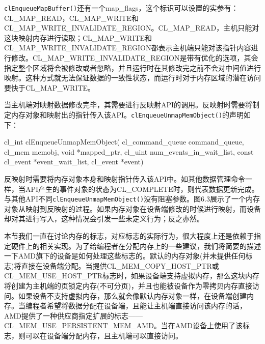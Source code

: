 \texttt{clEnqueueMapBuffer()}还有一个map\_\allowbreak{}flags，这个标识可以设置的实参有：CL\_\allowbreak{}MAP\_\allowbreak{}READ，CL\_\allowbreak{}MAP\_\allowbreak{}WRITE和CL\_\allowbreak{}MAP\_\allowbreak{}WRITE\_\allowbreak{}INVALIDATE\_\allowbreak{}REGION。CL\_\allowbreak{}MAP\_\allowbreak{}READ，主机只能对这块映射内存进行读取；CL\_\allowbreak{}MAP\_\allowbreak{}WRITE和CL\_\allowbreak{}MAP\_\allowbreak{}WRITE\_\allowbreak{}INVALIDATE\_\allowbreak{}REGION都表示主机端只能对该指针内容进行修改。CL\_\allowbreak{}MAP\_\allowbreak{}WRITE\_\allowbreak{}INVALIDATE\_\allowbreak{}REGION是带有优化的选项，其会指定整个区域将会被修改或者忽略，并且运行时在其修改完之前不会对中间值进行映射。这种方式就无法保证数据的一致性状态，而运行时对于内存区域的潜在访问要快于CL\_\allowbreak{}MAP\_\allowbreak{}WRITE。

当主机端对映射数据修改完毕，其需要进行反映射API的调用。反映射时需要将制定内存对象和映射出的指针传入该API。\texttt{clEnqueueUnmapMemObject()}的声明如下：

\begin{codebox}[cpp]
cl_int
clEnqueueUnmapMemObject(
  cl_command_queue command_queue,
  cl_mem memobj,
  void *mapped_ptr,
  cl_uint num_events_in_wait_list,
  const cl_event *event_wait_list,
  cl_event *event)
\end{codebox}

反映射时需要将内存对象本身和映射指针传入该API中。如其他数据管理命令一样，当API产生的事件对象的状态为CL\_\allowbreak{}COMPLETE时，则代表数据更新完成。与其他API不同\texttt{clEnqueueUnmapMemObject()}没有阻塞参数。图6.3展示了一个内存对象从映射到反映射的过程。如果内存对象在设备端修改的时候进行映射，而设备却对其进行写入，这种情况会引发一些未定义行为；反之亦然。


本节我们一直在讨论内存的标志，对应标志的实际行为，很大程度上还是依赖于指定硬件上的相关实现。为了给编程者在分配内存上的一些建议，我们将简要的描述一下AMD旗下的设备是如何处理这些标志的。默认的内存对象(并未提供任何标志)将直接在设备端分配。当提供CL\_\allowbreak{}MEM\_\allowbreak{}COPY\_\allowbreak{}HOST\_\allowbreak{}PTR或CL\_\allowbreak{}MEM\_\allowbreak{}USE\_\allowbreak{}HOST\_\allowbreak{}PTR标志时，如果设备端支持虚拟内存，那么这块内存将创建为主机端的页锁定内存(不可分页)，并且也能被设备作为零拷贝内存直接访问。如果设备不支持虚拟内存，那么就会像默认内存对象一样，在设备端创建内存。当编程者希望将数据分配在设备端，且能让主机端直接访问该内存的话，AMD提供了一种供应商指定扩展的标志——CL\_\allowbreak{}MEM\_\allowbreak{}USE\_\allowbreak{}PERSISTENT\_\allowbreak{}MEM\_\allowbreak{}AMD。当在AMD设备上使用了该标志，则可以在设备端分配内存，且主机端可以直接访问。



